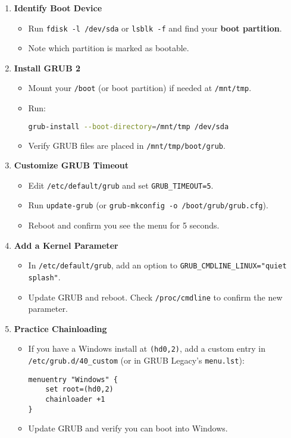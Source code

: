 \documentclass[12pt,a4paper]{report}
\begin{document}
\begin{enumerate}
    \item \textbf{Identify Boot Device}
    \begin{itemize}
        \item Run \texttt{fdisk -l /dev/sda} or \texttt{lsblk -f} and find your \textbf{boot partition}.
        \item Note which partition is marked as bootable.
    \end{itemize}

    \item \textbf{Install GRUB 2}
    \begin{itemize}
        \item Mount your \texttt{/boot} (or boot partition) if needed at \texttt{/mnt/tmp}.
        \item Run:
        \begin{lstlisting}[language=bash]
grub-install --boot-directory=/mnt/tmp /dev/sda
        \end{lstlisting}
        \item Verify GRUB files are placed in \texttt{/mnt/tmp/boot/grub}.
    \end{itemize}

    \item \textbf{Customize GRUB Timeout}
    \begin{itemize}
        \item Edit \texttt{/etc/default/grub} and set \texttt{GRUB\_TIMEOUT=5}.
        \item Run \texttt{update-grub} (or \texttt{grub-mkconfig -o /boot/grub/grub.cfg}).
        \item Reboot and confirm you see the menu for 5 seconds.
    \end{itemize}

    \item \textbf{Add a Kernel Parameter}
    \begin{itemize}
        \item In \texttt{/etc/default/grub}, add an option to \texttt{GRUB\_CMDLINE\_LINUX="quiet splash"}.
        \item Update GRUB and reboot. Check \texttt{/proc/cmdline} to confirm the new parameter.
    \end{itemize}

    \item \textbf{Practice Chainloading}
    \begin{itemize}
        \item If you have a Windows install at \texttt{(hd0,2)}, add a custom entry in \texttt{/etc/grub.d/40\_custom} (or in GRUB Legacy’s \texttt{menu.lst}):
        \begin{lstlisting}
menuentry "Windows" {
    set root=(hd0,2)
    chainloader +1
}
        \end{lstlisting}
        \item Update GRUB and verify you can boot into Windows.
    \end{itemize}


\end{enumerate}
\end{document}
